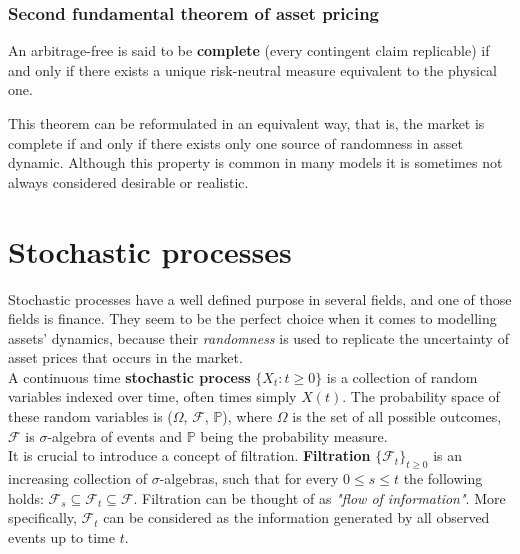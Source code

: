 \documentclass[times, utf8, diplomski]{fer}
\begin{document}


\subsection{Second fundamental theorem of asset pricing}
\begin{theorem}
An arbitrage-free is said to be \textbf{complete} (every contingent claim replicable) if and only if there exists a unique risk-neutral measure equivalent to the physical one.
\end{theorem}

\hfill \break
This theorem can be reformulated in an equivalent way, that is, the market is complete if and only if there exists only one source of randomness in asset dynamic. Although this property is common in many models it is sometimes not always considered desirable or realistic. 
\chapter{Stochastic processes}
Stochastic processes have a well defined purpose in several fields, and one of those fields is finance. They seem to be the perfect choice when it comes to modelling assets' dynamics, because their \textit{randomness} is used to replicate the uncertainty of asset prices that occurs in the market.\\

A continuous time \textbf{stochastic process} $\{X_t: t\ge 0\}$ is a collection of random variables indexed over time, often times simply $X(t)$. The probability space of these random variables is ($\Omega$, $\mathcal{F}$, $\mathbb{P}$), where $\Omega$ is the set of all possible outcomes, $\mathcal{F}$ is $\sigma$-algebra of events and $\mathbb{P}$ being the probability measure.\\
It is crucial to introduce a concept of filtration. \textbf{Filtration} $\{\mathcal{F}_t\}_{t\ge 0}$ is an increasing collection of $\sigma$-algebras, such that for every $0 \le s \le t$ the following holds: $\mathcal{F}_s \subseteq \mathcal{F}_t \subseteq \mathcal{F}$. Filtration can be thought of as \textit{"flow of information"}. More specifically, $\mathcal{F}_t$ can be considered as the information generated by all observed events up to time $t$.
\end{document}
